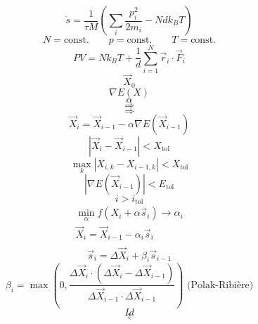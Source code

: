 \documentclass{scrreprt}
\begin{document}
\begin{equation}
  \dot s = \frac{1}{\tau M} \left(\sum_i{\frac{p_i^2}{2m_i}} - N d k_B T\right)
\end{equation}
\begin{equation}
  N = \text{const.}
  \qquad
  p = \text{const.}
  \qquad
  T = \text{const.}
\end{equation}
\begin{equation}
  PV = N k_B T + \frac{1}{d} \sum_{i=1}^N{\vec{r}_i \cdot \vec{F}_i}
\end{equation}
\begin{equation}
\vec X_0
\end{equation}
\begin{equation}
\nabla E(X)
\end{equation}
\begin{equation}
\alpha
\end{equation}
\begin{equation}
\Rightarrow
\end{equation}
\begin{equation}
\Rightarrow
\end{equation}
\begin{equation}
  \vec X_i = \vec X_{i-1} - \alpha \nabla E(\vec X_{i-1})
\end{equation}
\begin{equation}
\left|\vec X_i - \vec X_{i-1}\right| < X_\text{tol}
\end{equation}
\begin{equation}
\max_k{\left|X_{i,k} - X_{i-1,k}\right|} < X_\text{tol}
\end{equation}
\begin{equation}
\left|\nabla E(\vec X_{i-1})\right| < E_\text{tol}
\end{equation}
\begin{equation}
i > i_\text{tol}
\end{equation}
\begin{gather}
  \label{eq:cg-linesearch1}
  \min_\alpha f(X_i+\alpha \vec s_i) \rightarrow \alpha_i \\
  \label{eq:cg-linesearch2}
  \vec X_i = \vec X_{i-1} - \alpha_i \vec s_i\\
\end{gather}
\begin{equation}
  \label{eq:pr1}
  \vec s_i = \Delta \vec X_i + \beta_i \vec s_{i-1}
\end{equation}
\begin{equation}
  \label{eq:pr2}
  \beta_i = \max \left(0, \frac{\Delta \vec X_i \cdot \left(\Delta \vec X_i - \Delta \vec X_{i-1}\right)}{\Delta \vec X_{i-1} \cdot \Delta \vec X_{i-1}}\right) \text{~(Polak-Ribière)}
\end{equation}
\begin{equation}
Id
\end{equation}
\begin{equation}
_2
\end{equation}
\begin{equation}
\end{equation}
\end{document}
